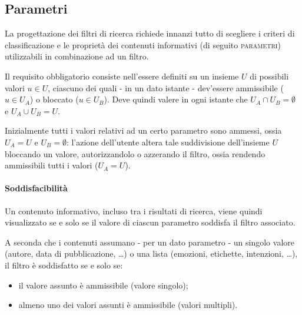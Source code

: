 \subsection{Parametri}
La progettazione dei filtri di ricerca richiede innanzi tutto di scegliere i criteri di classificazione e le proprietà dei contenuti informativi (di seguito \textsc{parametri}) utilizzabili in combinazione ad un filtro.

Il requisito obbligatorio consiste nell'essere definiti su un insieme $U$ di possibili valori $u \in U$, ciascuno dei quali - in un dato istante - dev'essere ammissibile ($u \in U_A$) o bloccato ($u \in U_B$). Deve quindi valere in ogni istante che $U_A \cap U_B = \emptyset$ e $U_A \cup U_B = U$.

Inizialmente tutti i valori relativi ad un certo parametro sono ammessi, ossia $U_A = U$ e $U_B = \emptyset$: l'azione dell'utente altera tale suddivisione dell'insieme $U$ bloccando un valore, autorizzandolo o azzerando il filtro, ossia rendendo ammissibili tutti i valori ($U_A = U$).

\paragraph{Soddisfacibilità}
Un contenuto informativo, incluso tra i risultati di ricerca, viene quindi visualizzato se e solo se il valore di ciascun parametro soddisfa il filtro associato.

A seconda che i contenuti assumano - per un dato parametro - un singolo valore (autore, data di pubblicazione, \ldots) o una lista (emozioni, etichette, intenzioni, \ldots), il filtro è soddisfatto se e solo se:
\begin{itemize}
\item il valore assunto è ammissibile (valore singolo);
\item almeno uno dei valori assunti è ammissibile (valori multipli).
\end{itemize}

